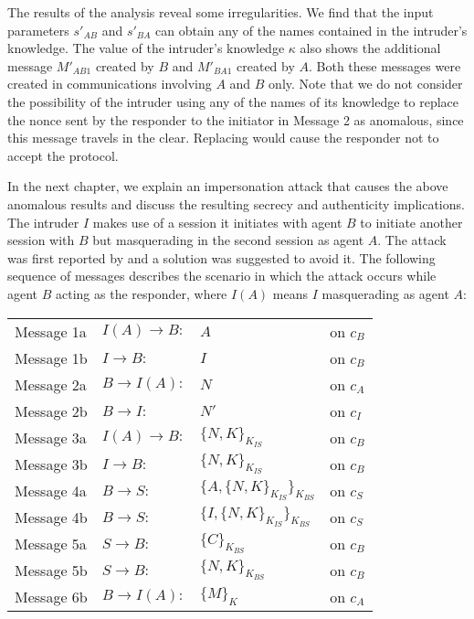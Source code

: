 \documentclass[10pt,a4paper,final,oneside,fleqn]{book}
\begin{document}
The results of the analysis reveal some irregularities.  We find that the input parameters $s'_{AB}$ and $s'_{BA}$ can obtain any of the names contained in the intruder's knowledge. The value of the intruder's knowledge $\kappa$ also shows the additional message $M'_{AB1}$ created by $B$ and $M'_{BA1}$ created by $A$. Both these messages were created in communications involving $A$ and $B$ only. Note that we do not consider the possibility of the intruder using any of the names of its knowledge to replace the nonce sent by the responder to the initiator in Message 2 as anomalous, since this message travels in the clear.  Replacing would cause the responder not to accept the protocol.

In the next chapter, we explain an impersonation attack that causes the above anomalous results and discuss the resulting secrecy and authenticity implications.  The intruder $I$ makes use of a session it initiates with agent $B$ to initiate another session with $B$ but masquerading in the second session as agent $A$. The attack was first reported by \cite{abadi5} and a solution was suggested to avoid it.  The following sequence of messages describes the scenario in which the attack occurs while agent $B$ acting as the responder, where $I(A)$ means $I$ masquerading as agent $A$:\vspace{5mm}

\begin{tabular}{llll}
Message 1a&\hspace{5mm}$I(A)\to B:$&$A$&on $c_{B}$\\
Message 1b&\hspace{5mm}$I\to B:$&$I$&on $c_{B}$\\
Message 2a&\hspace{5mm}$B\to I(A):$&$N$&on $c_{A}$\\
Message 2b&\hspace{5mm}$B\to I:$&$N'$&on $c_{I}$\\
Message 3a&\hspace{5mm}$I(A)\to B:$&$\{N,K\}_{K_{IS}}$&on $c_{B}$\\
Message 3b&\hspace{5mm}$I\to B:$&$\{N,K\}_{K_{IS}}$&on $c_{B}$\\
Message 4a&\hspace{5mm}$B\to S:$&$\{A,\{N,K\}_{K_{IS}}\}_{K_{BS}}$&on $c_{S}$\\
Message 4b&\hspace{5mm}$B\to S:$&$\{I,\{N,K\}_{K_{IS}}\}_{K_{BS}}$&on $c_{S}$\\ Message 5a&\hspace{5mm}$S\to B:$&$\{C\}_{K_{BS}}$&on $c_{B}$\\
Message 5b&\hspace{5mm}$S\to B:$&$\{N,K\}_{K_{BS}}$&on $c_{B}$\\
Message 6b&\hspace{5mm}$B\to I(A):$&$\{M\}_{K}$&on $c_{A}$
\end{tabular}\vspace{5mm}
\end{document}
